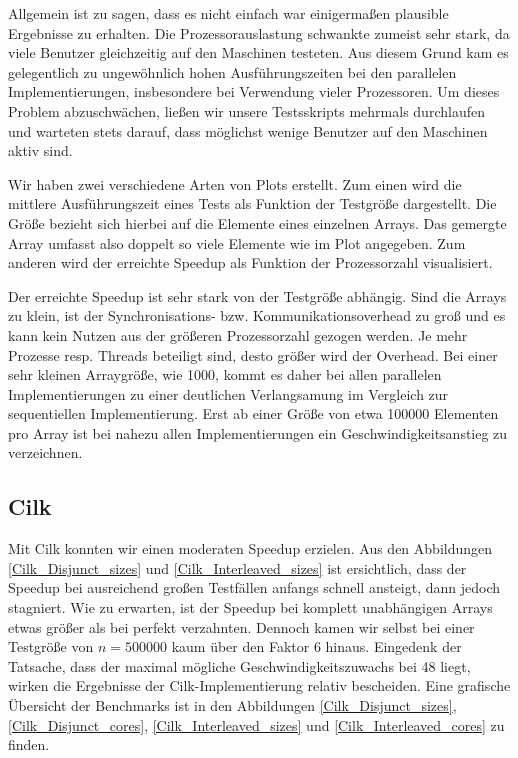 Allgemein ist zu sagen, dass es nicht einfach war einigermaßen plausible Ergebnisse zu erhalten.
Die Prozessorauslastung schwankte zumeist sehr stark, da viele Benutzer gleichzeitig auf den Maschinen testeten.
Aus diesem Grund kam es gelegentlich zu ungewöhnlich hohen Ausführungszeiten bei den parallelen Implementierungen, insbesondere bei Verwendung vieler Prozessoren.
Um dieses Problem abzuschwächen, ließen wir unsere Testsskripts mehrmals durchlaufen und warteten stets darauf, dass möglichst wenige Benutzer auf den Maschinen aktiv sind.

Wir haben zwei verschiedene Arten von Plots erstellt.
Zum einen wird die mittlere Ausführungszeit eines Tests als Funktion der Testgröße dargestellt.
Die Größe bezieht sich hierbei auf die Elemente eines einzelnen Arrays.
Das gemergte Array umfasst also doppelt so viele Elemente wie im Plot angegeben.
Zum anderen wird der erreichte Speedup als Funktion der Prozessorzahl visualisiert.

Der erreichte Speedup ist sehr stark von der Testgröße abhängig.
Sind die Arrays zu klein, ist der Synchronisations- bzw. Kommunikationsoverhead zu groß und es kann kein Nutzen aus der größeren Prozessorzahl gezogen werden.
Je mehr Prozesse resp. Threads beteiligt sind, desto größer wird der Overhead.
Bei einer sehr kleinen Arraygröße, wie 1000, kommt es daher bei allen parallelen Implementierungen zu einer deutlichen Verlangsamung im Vergleich zur sequentiellen Implementierung.
Erst ab einer Größe von etwa 100000 Elementen pro Array ist bei nahezu allen Implementierungen ein Geschwindigkeitsanstieg zu verzeichnen. 


\subsection{Cilk}
Mit Cilk konnten wir einen moderaten Speedup erzielen.
Aus den Abbildungen \ref{Cilk_Disjunct_sizes} und \ref{Cilk_Interleaved_sizes} ist ersichtlich, dass der Speedup bei ausreichend großen Testfällen anfangs schnell ansteigt, dann jedoch stagniert.
Wie zu erwarten, ist der Speedup bei komplett unabhängigen Arrays etwas größer als bei perfekt verzahnten.
Dennoch kamen wir selbst bei einer Testgröße von $n = 500000$ kaum über den Faktor 6 hinaus.
Eingedenk der Tatsache, dass der maximal mögliche Geschwindigkeitszuwachs bei 48 liegt, wirken die Ergebnisse der Cilk-Implementierung relativ bescheiden.
Eine grafische Übersicht der Benchmarks ist in den Abbildungen \ref{Cilk_Disjunct_sizes}, \ref{Cilk_Disjunct_cores}, \ref{Cilk_Interleaved_sizes} und \ref{Cilk_Interleaved_cores} zu finden.


